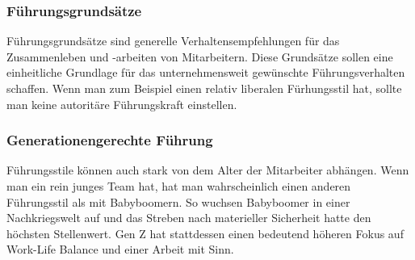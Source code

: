 \documentclass{article}
\begin{document}
	 \subsubsection{Führungsgrundsätze}
	 Führungsgrundsätze sind generelle Verhaltensempfehlungen für das Zusammenleben und -arbeiten von Mitarbeitern. Diese Grundsätze sollen eine einheitliche Grundlage für das unternehmensweit gewünschte Führungsverhalten schaffen. Wenn man zum Beispiel einen relativ liberalen Fürhungsstil hat, sollte man keine autoritäre Führungskraft einstellen.
	 \subsubsection{Generationengerechte Führung}
	 Führungsstile können auch stark von dem Alter der Mitarbeiter abhängen. Wenn man ein rein junges Team hat, hat man wahrscheinlich einen anderen Führungsstil als mit Babyboomern. So wuchsen Babyboomer in einer Nachkriegswelt auf und das Streben nach materieller Sicherheit hatte den höchsten Stellenwert. Gen Z hat stattdessen einen bedeutend höheren Fokus auf Work-Life Balance und einer Arbeit mit Sinn.
\end{document}
